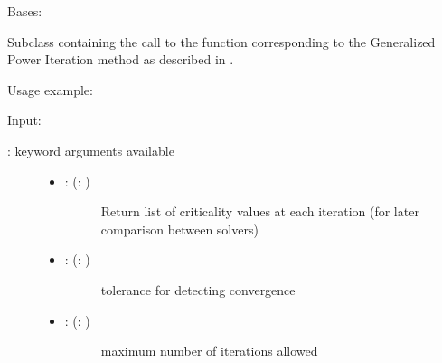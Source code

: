 \documentclass[a4paper,10pt,english]{sphinxmanual}
\begin{document}

\begin{fulllineitems}
\label{\detokenize{skprocrustes:skprocrustes.GPISolver}}
Bases: 

Subclass containing the call to the  function 
corresponding to the Generalized Power Iteration method as described in 
{\hyperref[\detokenize{index:bibliography}]{}}.

Usage example:

\begin{sphinxVerbatim}[commandchars=\\\{\}]
  
  
\end{sphinxVerbatim}

Input:
\begin{description}
\item[{: keyword arguments available}] \leavevmode\begin{itemize}
\item {} \begin{description}
\item[{: (: )}] \leavevmode
Return list of criticality values at each iteration (for later
comparison between solvers)

\end{description}

\item {} \begin{description}
\item[{: (: )}] \leavevmode
tolerance for detecting convergence

\end{description}

\item {} \begin{description}
\item[{: (: )}] \leavevmode
maximum number of iterations allowed


\end{description}
\end{itemize}
\end{description}
\end{fulllineitems}
\end{document}
